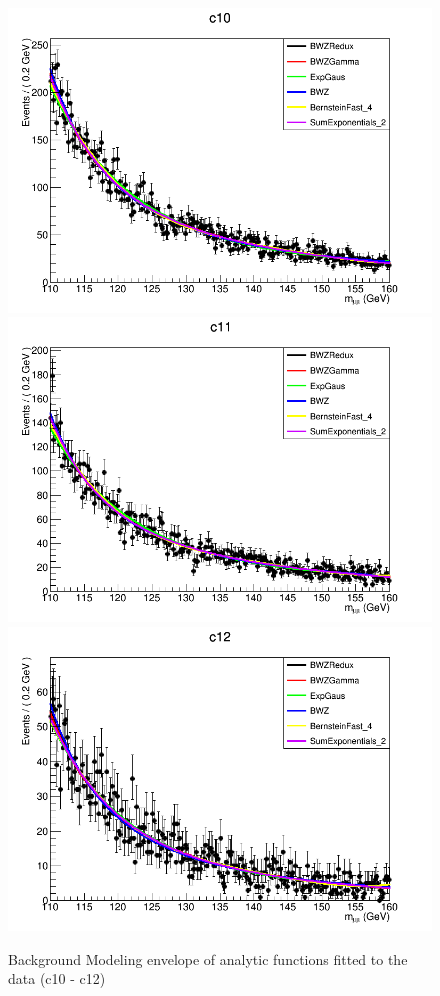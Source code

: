 \begin{figure}[hbp]
  \centering
  \includegraphics[width=0.65\linewidth]{figures/ch_higgs/backgroundmodel/uf_bdt/backgroundFits__c10__bkgModels.png}\\
  \includegraphics[width=0.65\linewidth]{figures/ch_higgs/backgroundmodel/uf_bdt/backgroundFits__c11__bkgModels.png}\\
  \includegraphics[width=0.65\linewidth]{figures/ch_higgs/backgroundmodel/uf_bdt/backgroundFits__c12__bkgModels.png}
  \caption{Background Modeling envelope of analytic functions fitted to the data (c10 - c12)}
  \label{fig:higgs_bmodel_bdtc10c12}
\end{figure}